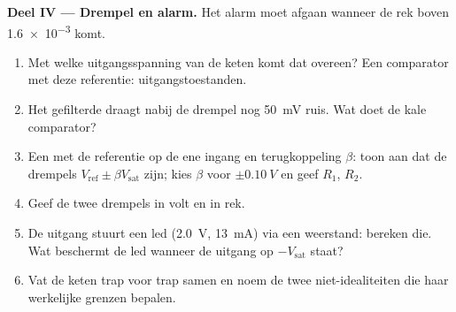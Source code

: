 \begin{problem}
\medskip
\noindent\textbf{Deel IV --- Drempel en alarm.}
Het alarm moet afgaan wanneer de rek boven \num{1.6e-3} komt.
\begin{enumerate}[resume]
  \item Met welke uitgangsspanning van de keten komt dat overeen? Een
        comparator met deze referentie: uitgangstoestanden.
  \item Het gefilterde  draagt nabij de drempel nog \qty{50}{mV} ruis.
        Wat doet de kale comparator?
  \item Een  met de referentie op de ene ingang en terugkoppeling
        $\beta$: toon aan dat de drempels $V_{\mathrm{ref}} \pm
        \beta V_{\mathrm{sat}}$ zijn; kies $\beta$ voor $\pm\qty{0.10}{V}$
        en geef $R_1$, $R_2$.
  \item Geef de twee drempels in volt en in rek.
  \item De uitgang stuurt een led (\qty{2.0}{V}, \qty{13}{mA}) via een
        weerstand: bereken die. Wat beschermt de led wanneer de uitgang
        op $-V_{\mathrm{sat}}$ staat?
  \item Vat de keten trap voor trap samen en noem de twee
        niet-idealiteiten die haar werkelijke grenzen bepalen.
\end{enumerate}
\end{problem}
